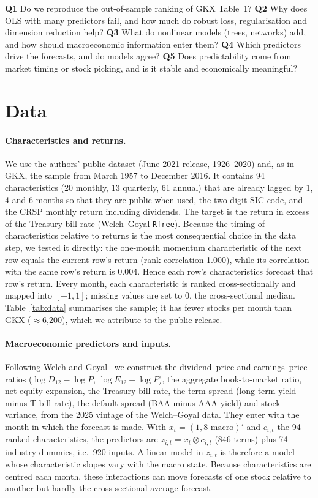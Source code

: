 \documentclass[10pt]{article}
\begin{document}
\textbf{Q1} Do we reproduce the out-of-sample ranking of GKX Table~1?
\textbf{Q2} Why does OLS with many predictors fail, and how much do robust loss, regularisation and dimension reduction help?
\textbf{Q3} What do nonlinear models (trees, networks) add, and how should macroeconomic information enter them?
\textbf{Q4} Which predictors drive the forecasts, and do models agree?
\textbf{Q5} Does predictability come from market timing or stock picking, and is it stable and economically meaningful?

\section{Data}
\paragraph{Characteristics and returns.} We use the authors' public dataset (June 2021 release, 1926--2020) and, as in GKX,
the sample from March 1957 to December 2016. It contains 94 characteristics (20 monthly, 13 quarterly, 61 annual) that are
already lagged by 1, 4 and 6 months so that they are public when used, the two-digit SIC code, and the CRSP monthly return
including dividends. The target is the return in excess of the Treasury-bill rate (Welch--Goyal \texttt{Rfree}).
Because the timing of characteristics relative to returns is the most consequential choice in the data step, we tested it
directly: the one-month momentum characteristic of the next row equals the current row's return (rank correlation 1.000),
while its correlation with the same row's return is 0.004. Hence each row's characteristics forecast that row's return.
Every month, each characteristic is ranked cross-sectionally and mapped into $[-1,1]$; missing values are set to 0, the
cross-sectional median. Table~\ref{tab:data} summarises the sample; it has fewer stocks per month than GKX ($\approx$6,200),
which we attribute to the public release.

\paragraph{Macroeconomic predictors and inputs.} Following Welch and Goyal~\cite{wg2008} we construct the dividend--price and
earnings--price ratios ($\log D_{12}-\log P$, $\log E_{12}-\log P$), the aggregate book-to-market ratio, net equity
expansion, the Treasury-bill rate, the term spread (long-term yield minus T-bill rate), the default spread (BAA minus AAA
yield) and stock variance, from the 2025 vintage of the Welch--Goyal data. They enter with the month in which the forecast
is made. With $x_t=(1,\text{8 macro})'$ and $c_{i,t}$ the 94 ranked characteristics, the predictors are
$z_{i,t}=x_t\otimes c_{i,t}$ (846 terms) plus 74 industry dummies, i.e.\ 920 inputs. A linear model in $z_{i,t}$ is
therefore a model whose characteristic slopes vary with the macro state. Because characteristics are centred each month,
these interactions can move forecasts of one stock relative to another but hardly the cross-sectional average forecast.
\end{document}
